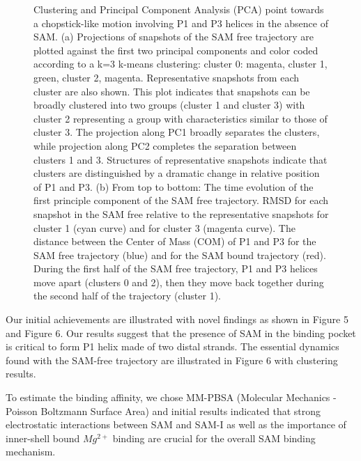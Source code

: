\documentclass[a4paper,10pt]{article}
\begin{document}
\begin{figure}
\caption{Clustering and Principal Component Analysis (PCA) point towards a chopstick-like 
motion involving P1 and P3 helices in the absence of SAM. 
(a) Projections of snapshots of the SAM free trajectory are plotted against the first two principal 
components and color coded according to a k=3 k-means clustering: cluster 0: magenta, cluster 1, 
green, cluster 2, magenta. Representative snapshots from each cluster are also shown. This plot 
indicates that snapshots can be broadly clustered into two groups (cluster 1 and cluster 3) with 
cluster 2 representing a group with characteristics similar to those of cluster 3. The projection 
along PC1 broadly separates the clusters, while projection along PC2 completes the separation 
between clusters 1 and 3. Structures of representative snapshots indicate that clusters are 
distinguished by a dramatic change in relative position of P1 and P3. (b) From top to bottom: 
The time evolution of the first principle component of the SAM free trajectory. RMSD for each snapshot in the SAM free relative to the 
representative snapshots for cluster 1 (cyan curve) and for cluster 3 (magenta curve). The 
distance between the Center of Mass (COM) of P1 and P3 for the SAM free trajectory (blue) and for 
the SAM bound trajectory (red).  During the first half of the SAM free trajectory, P1 and P3 helices move apart 
(clusters 0 and 2), then they move back together during the second half of the trajectory (cluster 
1).}

\end{figure}

Our initial achievements are illustrated with novel findings as shown in Figure 5 and Figure 6.  Our results suggest that the presence of SAM in the binding pocket is critical to form P1 helix made of two distal strands.  The essential dynamics found with the SAM-free trajectory are illustrated in Figure 6 with clustering results. 

To estimate the binding affinity, we chose MM-PBSA (Molecular Mechanics - Poisson Boltzmann Surface Area) and initial results indicated that strong electrostatic interactions between SAM and SAM-I as well as the importance of inner-shell bound $Mg^{2+}$ binding  are crucial for the overall SAM binding mechanism.  

\end{document}
